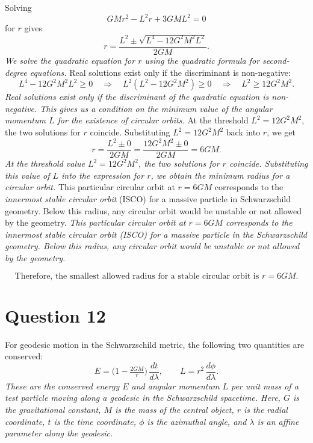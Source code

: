 Solving
\begin{equation*}
GM r^2 - L^2 r + 3 G M L^2 = 0
\end{equation*}
for $r$ gives
\begin{equation*}
r = \frac{L^2 \pm \sqrt{L^4 - 12 G^2 M^2 L^2}}{2 G M}.
\end{equation*}
\textit{We solve the quadratic equation for $r$ using the quadratic formula for second-degree equations.}
Real solutions exist only if the discriminant is non-negative:
\begin{equation*}
L^4 - 12 G^2 M^2 L^2 \ge 0
\quad \Longrightarrow \quad
L^2 \left(L^2 - 12 G^2 M^2\right) \ge 0
\quad \Longrightarrow \quad
L^2 \ge 12 G^2 M^2.
\end{equation*}
\textit{Real solutions exist only if the discriminant of the quadratic equation is non-negative. This gives us a condition on the minimum value of the angular momentum $L$ for the existence of circular orbits.}
At the threshold $L^2 = 12 G^2 M^2$, the two solutions for $r$ coincide. Substituting $L^2 = 12 G^2 M^2$ back into $r$, we get
\begin{equation*}
r = \frac{L^2 \pm 0}{2 G M} = \frac{12 G^2 M^2 \pm 0}{2 G M} = 6 G M.
\end{equation*}
\textit{At the threshold value $L^2 = 12 G^2 M^2$, the two solutions for $r$ coincide. Substituting this value of $L$ into the expression for $r$, we obtain the minimum radius for a circular orbit.}
This particular circular orbit at $r = 6 G M$ corresponds to the \emph{innermost stable circular orbit} (ISCO) for a massive particle in Schwarzschild geometry. Below this radius, any circular orbit would be unstable or not allowed by the geometry.
\textit{This particular circular orbit at $r = 6 G M$ corresponds to the innermost stable circular orbit (ISCO) for a massive particle in the Schwarzschild geometry. Below this radius, any circular orbit would be unstable or not allowed by the geometry.}


\[
\boxed{
\text{Therefore, the smallest allowed radius for a stable circular orbit is } r = 6 G M.
}
\]


\section*{Question 12}
For geodesic motion in the Schwarzschild metric, the following two quantities are conserved:
\[
E = \bigl(1 - \tfrac{2 G M}{r}\bigr)\,\frac{dt}{d\lambda},
\qquad
L = r^{2}\,\frac{d\phi}{d\lambda}.
\]
\textit{These are the conserved energy $E$ and angular momentum $L$ per unit mass of a test particle moving along a geodesic in the Schwarzschild spacetime. Here, $G$ is the gravitational constant, $M$ is the mass of the central object, $r$ is the radial coordinate, $t$ is the time coordinate, $\phi$ is the azimuthal angle, and $\lambda$ is an affine parameter along the geodesic.}

